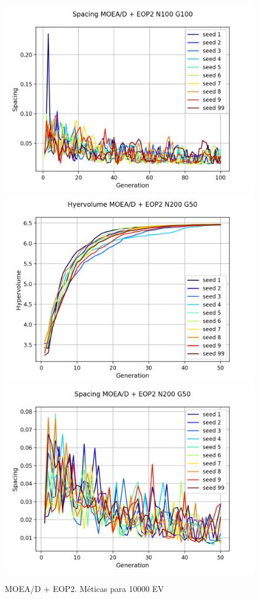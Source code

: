 \begin{figure}[H]
\includegraphics[scale=0.5]{figures/METRICS_EOP2/Spacing_N100_G100.png}\\
\includegraphics[scale=0.5]{figures/METRICS_EOP2/Hypervol_N200_G50.png}\quad 
\includegraphics[scale=0.5]{figures/METRICS_EOP2/Spacing_N200_G50.png}\\
\caption{MOEA/D + EOP2. Méticas para 10000 EV}
\label{fig:14}
\end{figure}



